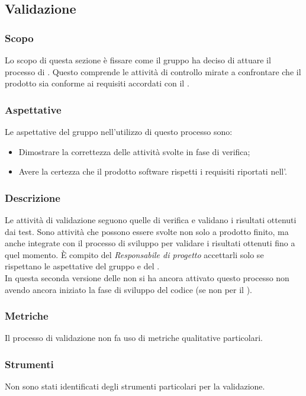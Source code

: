 \subsection{Validazione}
\subsubsection{Scopo}
Lo scopo di questa sezione è fissare come il gruppo ha deciso di attuare il processo di . Questo comprende le attività di controllo mirate a confrontare che il prodotto sia conforme ai requisiti accordati con il .

\subsubsection{Aspettative}
Le aspettative del gruppo \Gruppo{} nell'utilizzo di questo processo sono:
\begin{itemize}
	\item Dimostrare la correttezza delle attività svolte in fase di verifica; 
	\item Avere la certezza che il prodotto software rispetti i requisiti riportati nell'\AdR{}.
\end{itemize}

\subsubsection{Descrizione}
Le attività di validazione seguono quelle di verifica e validano i risultati ottenuti dai test. Sono attività che possono essere svolte non solo a prodotto finito, ma anche integrate con il processo di sviluppo per validare i risultati ottenuti fino a quel momento. È compito del \textit{Responsabile di progetto} accettarli solo se rispettano le aspettative del gruppo e del . \\
\linebreak
In questa seconda versione delle \NdP{} non si ha ancora attivato questo processo non avendo ancora iniziato la fase di sviluppo del codice (se non per il ).

\subsubsection{Metriche}
Il processo di validazione non fa uso di metriche qualitative particolari.

\subsubsection{Strumenti}
Non sono stati identificati degli strumenti particolari per la validazione.

